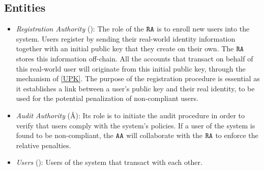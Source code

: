 \subsection{Entities}
\begin{itemize}
    \item \emph{Registration Authority} (\RA): The role of the $\RA$ is to enroll new users into the system. Users register by sending their real-world identity information together with an initial public key that they create on their own.
    The $\RA$ stores this information off-chain. 
    All the accounts that transact on behalf of this real-world user will originate from this initial public key, through the mechanism of \autoref{UPK}.
    The purpose of the registration procedure is essential as it establishes a link between a user's public key and their real identity, to be used for the potential penalization of non-compliant users.
    
    \item \emph{Audit Authority} (\AA): 
    Its role is to initiate the audit procedure in order to verify that users comply with the system's policies. 
    If a user of the system is found to be non-compliant, the $\AA$ will collaborate with the $\RA$ to enforce the relative penalties.

    \item \emph{Users} (\UU): Users of the system that transact with each other.
\end{itemize}
    